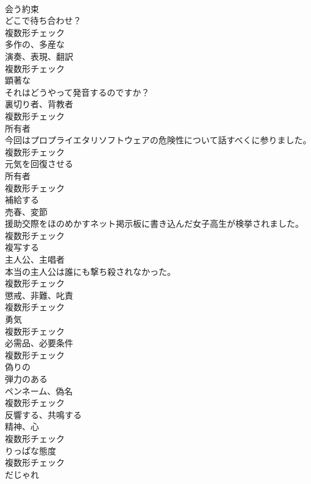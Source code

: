 \documentclass[8pt]{extreport}
\begin{document}
\begin{CJK}{UTF8}{min}
\\	[名詞]	会う約束	
\\	どこで待ち合わせ？	
\\	複数形チェック
\\	[形容詞]	多作の、多産な	
\\	[名詞]	演奏、表現、翻訳	
\\	複数形チェック
\\	[形容詞]	顕著な	
\\	それはどうやって発音するのですか？	
\\	[名詞]	裏切り者、背教者	
\\	複数形チェック
\\	[名詞]	所有者	
\\	今回はプロプライエタリソフトウェアの危険性について話すべくに参りました。	
\\	複数形チェック
\\	[動詞]	元気を回復させる	
\\	[名詞]	所有者	
\\	複数形チェック
\\	[動詞]	補給する	
\\	[名詞]	売春、変節	
\\	援助交際をほのめかすネット掲示板に書き込んだ女子高生が検挙されました。	
\\	複数形チェック
\\	[動詞]	複写する	
\\	[名詞]	主人公、主唱者	
\\	本当の主人公は誰にも撃ち殺されなかった。	
\\	複数形チェック
\\	[名詞]	懲戒、非難、叱責	
\\	複数形チェック
\\	[名詞]	勇気	
\\	複数形チェック
\\	[名詞]	必需品、必要条件	
\\	複数形チェック
\\	[形容詞]	偽りの	
\\	[形容詞]	弾力のある	
\\	[名詞]	ペンネーム、偽名	
\\	複数形チェック
\\	[形容詞]	反響する、共鳴する	
\\	[名詞]	精神、心	
\\	複数形チェック
\\	[名詞]	りっぱな態度	
\\	複数形チェック
\\	[名詞]	だじゃれ	

\end{CJK}
\end{document}
